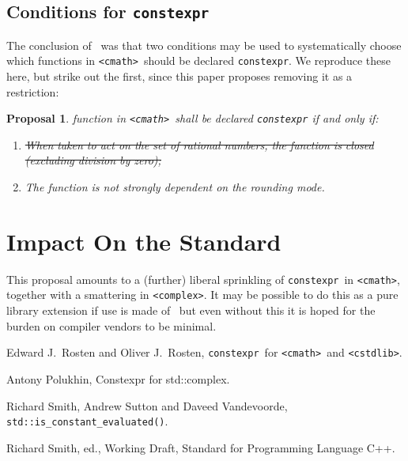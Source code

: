 \documentclass[prd,twocolumn,amsmath,amssymb,nofootinbib,eqsecnum]{revtex4-1}
\newcommand{\constexpr}{\code{constexpr}\xspace}
\newcommand{\code}[1]{{\tt #1}}
\newcommand{\header}[1]{{\tt <#1>}}
\newcommand{\cmath}{\header{cmath}}
\newcommand{\complex}{\header{complex}}
\newcommand{\cstdlib}{\header{cstdlib}}
\newtheorem*{proposal*}{Proposal}
\begin{document}
\subsection{Conditions for \constexpr}

The conclusion of~\cite{Rosten-constexpr} was that two conditions may be used to systematically choose which functions in \cmath\ should be declared \constexpr. We reproduce these here, but strike out the first, since this paper proposes removing it as a restriction:

\begin{proposal*}
	function in \cmath\ shall be declared \constexpr if and only if:
	\begin{enumerate}
		\item \st{When taken to act on the set of rational numbers, the function is closed (excluding division 
		by zero);}
		
		\item The function is not strongly dependent on the rounding mode.
	\end{enumerate}
\end{proposal*}





\section{Impact On the Standard}

This proposal amounts to a (further) liberal sprinkling of \constexpr\ in \cmath, together with a smattering in \complex. It may be possible to do this as a pure library extension if use is made of~\cite{ConstEval} but even without this it is hoped for the burden on compiler vendors to be minimal.





\begin{thebibliography}{1}
	 Edward J.~Rosten and Oliver J.~Rosten, \constexpr\ for \cmath\ and \cstdlib.

	 Antony Polukhin, Constexpr for std::complex.	
	
	 Richard Smith, Andrew Sutton and Daveed Vandevoorde, \code{std\!::\!is\_constant\_evaluated()}.
	
	 Richard Smith, ed., Working Draft, Standard for Programming Language C++.	
\end{thebibliography}
\end{document}
